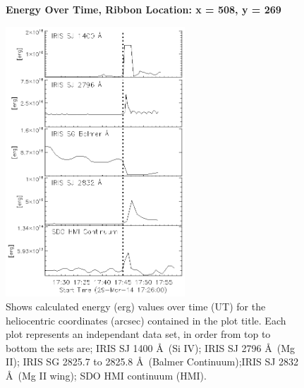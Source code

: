 \begin{figure}[H]
  \begin{center}
  \textbf{Energy Over Time, Ribbon Location: x = 508, y = 269 }\par\medskip
  \includegraphics[width=0.6\textwidth]{29-Mar-14-Ribbon-xyPosition-508-269-Frame-2-Energy-Ladder}
  \end{center}
  \caption{Shows calculated energy (erg) values over time (UT) for the heliocentric coordinates (arcsec) contained in the plot title. Each plot represents an independant data set, in order from top to bottom the sets are; IRIS SJ 1400 \AA\ (Si IV); IRIS SJ 2796 \AA\ (Mg II); IRIS SG  2825.7 to 2825.8 \AA\ (Balmer Continuum);IRIS SJ 2832 \AA\ (Mg II wing); SDO HMI continuum (HMI).}\label{erb19}
\end{figure}

